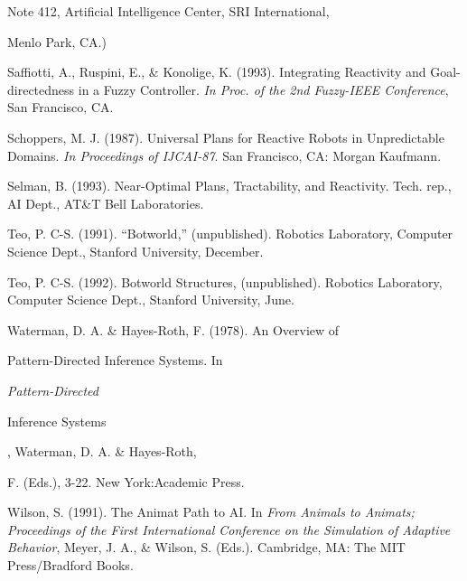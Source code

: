 \begin{thebibliography}{}
Note 412, Artificial Intelligence Center, SRI International, 

Menlo Park, CA.)

Saffiotti, A., Ruspini, E., \& Konolige, K. (1993). Integrating Reactivity  
and Goal-directedness in a Fuzzy Controller. {\it In Proc. of the 2nd  
Fuzzy-IEEE Conference}, San Francisco, CA.


Schoppers, M. J. (1987). Universal Plans for Reactive Robots in Unpredictable  
Domains. {\it In Proceedings of IJCAI-87}. San Francisco, CA: Morgan  
Kaufmann.

Selman, B. (1993). Near-Optimal Plans, Tractability, and Reactivity. Tech.  
rep., AI Dept., AT\&T Bell Laboratories.

Teo, P. C-S. (1991). ``Botworld,'' (unpublished).  Robotics Laboratory,  
Computer Science Dept., Stanford University, December.

Teo, P. C-S. (1992). Botworld Structures, (unpublished).  Robotics  
Laboratory, Computer Science Dept., Stanford University, June.

Waterman, D. A. \& Hayes-Roth, F. (1978). An Overview of 

Pattern-Directed Inference Systems. In {\it Pattern-Directed 

Inference Systems}, Waterman, D. A. \& Hayes-Roth, 

F. (Eds.), 3-22. New York:Academic Press.

Wilson, S. (1991). The Animat Path to AI. In  {\it From Animals to Animats;  
Proceedings of the First International Conference on the Simulation of  
Adaptive Behavior}, Meyer, J. A., \& Wilson, S. (Eds.). Cambridge, MA: The  
MIT Press/Bradford Books.


\end{thebibliography} 

 
 




